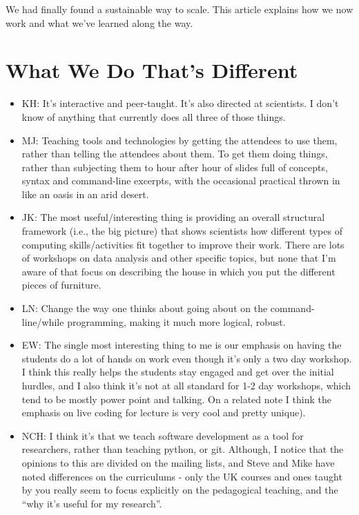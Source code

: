 \documentclass{article}
\begin{document}
We had finally found a sustainable way to scale.
This article explains how we now work
and what we've learned along the way.

\section{What We Do That's Different}

\begin{itemize}

  \item KH: It's interactive and peer-taught. It's also directed at
    scientists. I don't know of anything that currently does all three
    of those things.

  \item MJ: Teaching tools and technologies by getting the attendees
    to use them, rather than telling the attendees about them. To get
    them doing things, rather than subjecting them to hour after hour
    of slides full of concepts, syntax and command-line excerpts, with
    the occasional practical thrown in like an oasis in an arid
    desert.

  \item JK: The most useful/interesting thing is providing an overall
    structural framework (i.e., the big picture) that shows scientists
    how different types of computing skills/activities fit together to
    improve their work. There are lots of workshops on data analysis
    and other specific topics, but none that I'm aware of that focus
    on describing the house in which you put the different pieces of
    furniture.

  \item LN: Change the way one thinks about going about on the
    command-line/while programming, making it much more logical,
    robust.

  \item EW: The single most interesting thing to me is our emphasis on
    having the students do a lot of hands on work even though it's
    only a two day workshop. I think this really helps the students
    stay engaged and get over the initial hurdles, and I also think
    it's not at all standard for 1-2 day workshops, which tend to be
    mostly power point and talking. On a related note I think the
    emphasis on live coding for lecture is very cool and pretty
    unique).

  \item NCH: I think it's that we teach software development as a tool
    for researchers, rather than teaching python, or git. Although, I
    notice that the opinions to this are divided on the mailing lists,
    and Steve and Mike have noted differences on the curriculums -
    only the UK courses and ones taught by you really seem to focus
    explicitly on the pedagogical teaching, and the ``why it's useful
    for my research''.


\end{itemize}
\end{document}
